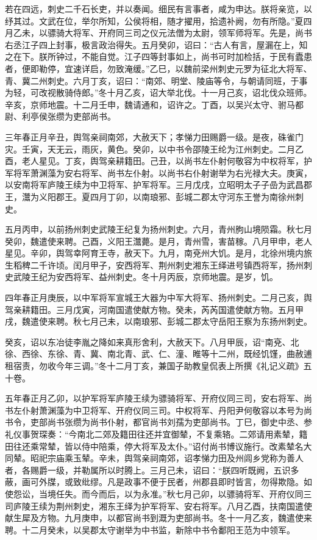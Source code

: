 \documentclass[12pt,UTF8]{ctexbook}
\begin{document}
若在四远，刺史二千石长吏，并以奏闻。细民有言事者，咸为申达。朕将亲览，以纾其过。文武在位，举尔所知，公侯将相，随才擢用，拾遗补阙，勿有所隐。”夏四月乙未，以骠骑大将军、开府同三司之仪元法僧为太尉，领军师将军。先是，尚书右丞江子四上封事，极言政治得失。五月癸卯，诏曰：“古人有言，屋漏在上，知之在下。朕所钟过，不能自觉。江子四等封事如上，尚书可时加检括，于民有蠹患者，便即勒停，宜速详启，勿致淹缓。”乙巳，以魏前梁州刺史元罗为征北大将军、青、冀二州刺史。六月丁亥，诏曰：“南郊、明堂、陵庙等令，与朝请同班，于事为轻，可改视散骑侍郎。”冬十月乙亥，诏大举北伐。十一月己亥，诏北伐众班师。辛亥，京师地震。十二月壬申，魏请通和，诏许之。丁酉，以吴兴太守、驸马都尉、利亭侯张缵为吏部尚书。

三年春正月辛丑，舆驾亲祠南郊，大赦天下；孝悌力田赐爵一级。是夜，硃雀门灾。壬寅，天无云，雨灰，黄色。癸卯，以中书令邵陵王纶为江州刺史。二月乙酉，老人星见。丁亥，舆驾亲耕籍田。己丑，以尚书左仆射何敬容为中权将军，护军将军萧渊藻为安右将军、尚书左仆射。以尚书右仆射谢举为右光禄大夫。庚寅，以安南将军庐陵王续为中卫将军、护军将军。三月戊戌，立昭明太子子嵒为武昌郡王，灊为义阳郡王。夏四月丁卯，以南琅邪、彭城二郡太守河东王誉为南徐州刺史。

五月丙申，以前扬州刺史武陵王纪复为扬州刺史。六月，青州朐山境陨霜。秋七月癸卯，魏遣使来聘。己酉，义阳王灊薨。是月，青州雪，害苗稼。八月甲申，老人星见。辛卯，舆驾幸阿育王寺，赦天下。九月，南兗州大饥。是月，北徐州境内旅生稻稗二千许顷。闰月甲子，安西将军、荆州刺史湘东王绎进号镇西将军，扬州刺史武陵王纪为安西将军、益州刺史。冬十月丙辰，京师地震。是岁，饥。

四年春正月庚辰，以中军将军宣城王大器为中军大将军、扬州刺史。二月己亥，舆驾亲耕籍田。三月戊寅，河南国遣使献方物。癸未，芮芮国遣使献方物。五月甲戌，魏遣使来聘。秋七月己未，以南琅邪、彭城二郡太守岳阳王察为东扬州刺史。

癸亥，诏以东冶徒李胤之降如来真形舍利，大赦天下。八月甲辰，诏“南兗、北徐、西徐、东徐、青、冀、南北青、武、仁、潼、睢等十二州，既经饥馑，曲赦逋租宿责，勿收今年三调。”冬十二月丁亥，兼国子助教皇侃表上所撰《礼记义疏》五十卷。

五年春正月乙卯，以护军将军庐陵王续为骠骑将军、开府仪同三司，安右将军、尚书左仆射萧渊藻为中卫将军、开府仪同三司。中权将军、丹阳尹何敬容以本号为尚书令，吏部尚书张缵为尚书仆射，都官尚书刘孺为吏部尚书。丁巳，御史中丞、参礼仪事贺琛奏：“今南北二郊及籍田往还并宜御辇，不复乘辂。二郊请用素辇，籍田往还乘常辇，皆以侍中陪乘，停大将军及太仆。”诏付尚书博议施行。改素辇名大同辇。昭祀宗庙乘玉辇。辛未，舆驾亲祠南郊，诏孝悌力田及州闾乡党称为善人者，各赐爵一级，并勒属所以时腾上。三月己未，诏曰：“朕四听既阙，五识多蔽，画可外牒，或致纰缪。凡是政事不便于民者，州郡县即时皆言，勿得欺隐。如使怨讼，当境任失。而今而后，以为永准。”秋七月己卯，以骠骑将军、开府仪同三司庐陵王续为荆州刺史，湘东王绎为护军将军、安右将军。八月乙酉，扶南国遣使献生犀及方物。九月庚申，以都官尚书到溉为吏部尚书。冬十一月乙亥，魏遣使来聘。十二月癸未，以吴郡太守谢举为中书监，新除中书令鄱阳王范为中领军。
\end{document}
